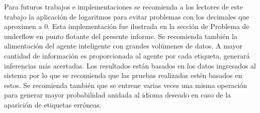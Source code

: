 \documentclass[sigconf]{acmart}
\begin{document}
Para futuros trabajos e implementaciones se recomienda a los lectores de este trabajo la aplicación de logaritmos para evitar problemas con los decimales que aproximen a 0. Esta implementación fue ilustrada en la sección de Problema de underflow en punto flotante del presente informe.
Se recomienda también la alimentación del agente inteligente con grandes volúmenes de datos. A mayor cantidad de información es proporcionada al agente por cada etiqueta, generará inferencias más acertadas. 
Los resultados están basados en los datos ingresados al sistema por lo que se recomienda que las pruebas realizadas estén basados en estos. Se recomienda también que se entrene varias veces una misma operación para generar mayor probabilidad anidada al idioma deseado en caso de la aparición de etiquetas erróneas.



\end{document}

